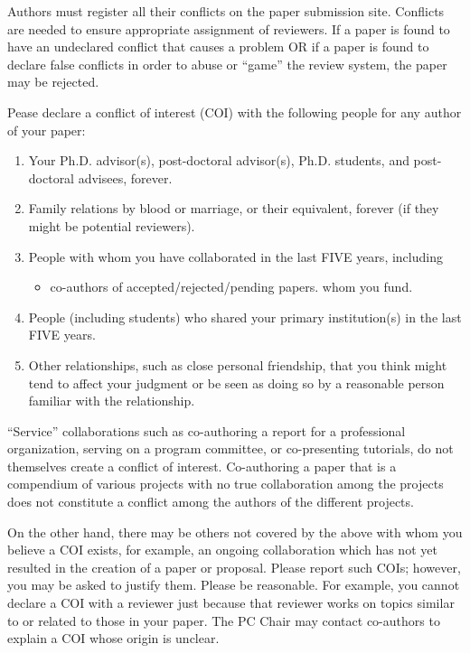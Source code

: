 \documentclass{sig-alternate}
\begin{document}
Authors must register all their conflicts on the paper submission site.
Conflicts are needed to ensure appropriate assignment of reviewers.
If a paper is found to have an undeclared conflict that causes
a problem OR if a paper is found to declare false conflicts in order to
abuse or ``game'' the review system, the paper may be rejected.

Pease declare a conflict of interest (COI) with the following people for any author of your paper:

\begin{enumerate}
\item Your Ph.D. advisor(s), post-doctoral advisor(s), Ph.D. students,
      and post-doctoral advisees, forever.
\item Family relations by blood or marriage, or their equivalent,
      forever (if they might be potential reviewers).
\item People with whom you have collaborated in the last FIVE years, including
\begin{itemize}
\item co-authors of accepted/rejected/pending papers.
      whom you fund.
\end{itemize}
\item People (including students) who shared your primary institution(s) in the
last FIVE years.
\item Other relationships, such as close personal friendship, that you think might tend
to affect your judgment or be seen as doing so by a reasonable person familiar
with the relationship.
\end{enumerate}

``Service'' collaborations such as co-authoring a report for a professional
organization, serving on a program committee, or co-presenting
tutorials, do not themselves create a conflict of interest.
Co-authoring a paper that is a compendium of various projects with
no true collaboration among the projects does not constitute a
conflict among the authors of the different projects.

On the other hand, there may be others not covered by the above with
whom you believe a COI exists, for example, an ongoing collaboration
which has not yet resulted in the creation of a paper or proposal.
Please report such COIs; however, you may be asked to justify them.
Please be reasonable. For example, you cannot declare a COI with a
reviewer just because that reviewer works on topics similar to or
related to those in your paper.  The PC Chair may contact co-authors
to explain a COI whose origin is unclear.
\end{document}
